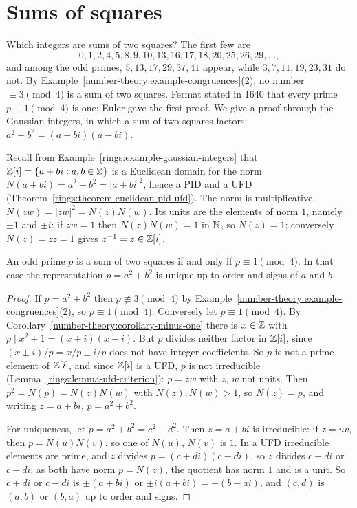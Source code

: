 \section{Sums of squares}\label{number-theory:section-squares}

Which integers are sums of two squares? The first few are
\[
0, 1, 2, 4, 5, 8, 9, 10, 13, 16, 17, 18, 20, 25, 26, 29, \ldots,
\]
and among the odd primes, $5, 13, 17, 29, 37, 41$ appear, while $3, 7, 11, 19, 23, 31$ do not. By Example~\ref{number-theory:example-congruences}(2), no number $\equiv 3 \pmod 4$ is a sum of two squares.
Fermat stated in 1640 that every prime $p \equiv 1 \pmod 4$ is one; Euler gave the first proof. We give a proof through the Gaussian integers, in which a sum of two squares factors:
$a^2 + b^2 = (a + bi)(a - bi)$.

Recall from Example~\ref{rings:example-gaussian-integers} that $\mathbb{Z}[i] = \{a + bi : a, b \in \mathbb{Z}\}$ is a Euclidean domain for the norm $N(a + bi) = a^2 + b^2 = |a + bi|^2$, hence a PID and a UFD
(Theorem~\ref{rings:theorem-euclidean-pid-ufd}). The norm is multiplicative, $N(zw) = |zw|^2 = N(z)N(w)$. Its units are the elements of norm $1$, namely $\pm1$ and $\pm i$: if $zw = 1$ then
$N(z)N(w) = 1$ in $\mathbb{N}$, so $N(z) = 1$; conversely $N(z) = z\bar{z} = 1$ gives $z^{-1} = \bar{z} \in \mathbb{Z}[i]$.

\begin{theorem}[Fermat]\label{number-theory:theorem-fermat-two-squares}
An odd prime $p$ is a sum of two squares if and only if $p \equiv 1 \pmod 4$. In that case the representation $p = a^2 + b^2$ is unique up to order and signs of $a$ and $b$.
\end{theorem}

\begin{proof}
If $p = a^2 + b^2$ then $p \not\equiv 3 \pmod 4$ by Example~\ref{number-theory:example-congruences}(2), so $p \equiv 1 \pmod 4$. Conversely let $p \equiv 1 \pmod 4$. By
Corollary~\ref{number-theory:corollary-minus-one} there is $x \in \mathbb{Z}$ with $p \mid x^2 + 1 = (x + i)(x - i)$. But $p$ divides neither factor in $\mathbb{Z}[i]$, since $(x \pm i)/p = x/p \pm i/p$ does not have
integer coefficients. So $p$ is not a prime element of $\mathbb{Z}[i]$, and since $\mathbb{Z}[i]$ is a UFD, $p$ is not irreducible (Lemma~\ref{rings:lemma-ufd-criterion}): $p = zw$ with $z$, $w$ not units. Then
$p^2 = N(p) = N(z)N(w)$ with $N(z), N(w) > 1$, so $N(z) = p$, and writing $z = a + bi$, $p = a^2 + b^2$.

For uniqueness, let $p = a^2 + b^2 = c^2 + d^2$. Then $z = a + bi$ is irreducible: if $z = uv$, then $p = N(u)N(v)$, so one of $N(u)$, $N(v)$ is $1$. In a UFD irreducible elements are prime, and $z$
divides $p = (c + di)(c - di)$, so $z$ divides $c + di$ or $c - di$; as both have norm $p = N(z)$, the quotient has norm $1$ and is a unit. So $c + di$ or $c - di$ is $\pm(a + bi)$ or
$\pm i(a + bi) = \mp(b - ai)$, and $(c, d)$ is $(a, b)$ or $(b, a)$ up to order and signs.
\end{proof}

